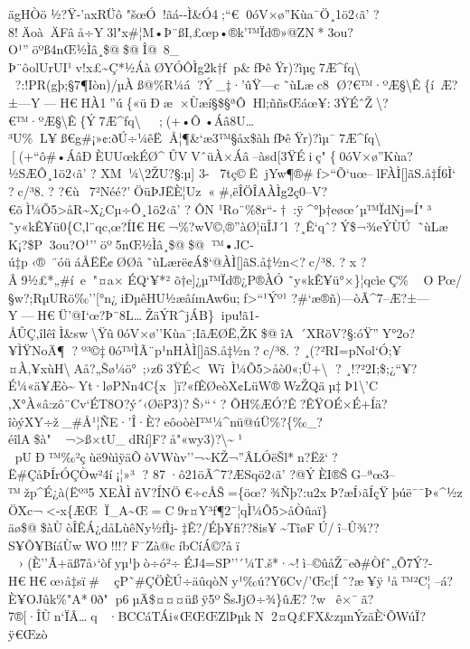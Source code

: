 ägHÒö ½?Ÿ-'axRÜô
"šœÓ!ãá-\/-Ì\textbar\&Ó4;``€0óV×ø''Kùa¯­Ö¸1ö2‹ã'  ? 
8!ÄoàÄFâå÷Y3l"x\#¦M•Þ¨ßI‚£œp•®k'™Ïd®»@ZN*3ou?O¹''öºß4nŒ½Ìâ¸\$@\$@Î@~8\_
Þ¨ôolUrUI¹v!x£\textasciitilde Ç*½ÁàØYÓÔÌg2k†fp\&fÞêŸr)?ìµç7Æ\^{}fq\textbackslash
?:!PR(gþ;§7¶Iòn)/µÀß@\%R¼á?Ý\_‡·'ûŸ---c˜ùLæc8
Ø?€™·ºÆ§\textbackslash Ê\{í~Æ?±---Y---H€HÀ1''ú\{«üÐæ×Ùæí§\$§ªÔHl;ññsŒáœ¥:3ŸÉˆŽ\textbackslash?€™·ºÆ§\textbackslash Ê\{Ý\textquotesingle7Æ\^{}fq\textbackslash

;(+•Ô•Áâ8U\ldots³U\%L¥ß€g\#¡»¢:ðÚ÷¼êËÅ¦¶\&`æ3™­§åx\$àhfÞêŸr)?ìµ¯7Æ\^{}fq\textbackslash

{[}(+``ô\#•ÁâÐÈUUœkÉØ\^{}ÛVVˆüÀ×Áâ--àsd{[}3ŸÉiç"\{0óV×ø''Kùa?½SÆÔ¸1ö2‹ã' 
?  XM~¼\textbackslash2ŽU?§:µ{]}
3-7tç©ËjYw¶®\#f\textgreater``Õ`uœ--lFÀÌ{[}{]}ãS.å‡Í6Ì` ?c/³8. ? 
?€ù~7²Néé?­'ÖüÞJËÈ¦Uz«\#,ëÎÖÎAÀÌg2ç0--V?€õÌ¼Õ5\textgreater åR\textasciitilde X¿Cµ÷Ô¸1ö2‹ã' 
?  ÔN \textquotesingle¹Ro¨\%8r``-†:ÿ\^{}°þ†eøœ´µ™ÏdNj=Í"³
˜y«k\textbar Ê¥ü0\{C,l¨qc,œ?ÍI€H€¬\%?wV©,®''àØ¦üÎJ´l~?¸Ê`qˆ?Ý\$¬¾eÝÙÚ˜ùLæ
K¡?\$P3ou?O¹''öº5nŒ½Ìâ¸\$@\$@™•JC­ú‡p‹®~¨óüáÅËË¢ØØå˜ùLærë¢Á\$`@ÀÌ{[}{]}ãS.å‡½n\textless?c/³8.
?  x ?Â9½£*„\#í~e"¤a× ÉQ`¥*² õ†e {]}¿µ™Ïd®¿P®ÀÓ
˜y«k\textbar Ê¥ü°×\}¦qcìeÇ\% O
Pœ/§w?;RµURö‰''{[}°n¿iÐµêHU½æâímAw6u;f\textgreater``¹Ýº¹
?\#`æ­®ñ)---òÃ\^{}7--Æ?±---Y---H€Ü'@I`œ?Þ¨8L\ldotsŽäÝR\^{}jÁB\}ipu!ã1­ÅÛÇ‚îlêîÌ\textbar\&sw\textbackslash Ÿû0óV×ø''Kùa¯;IãÆØË,ŽK\$@îA~´XRöV?§:óŸ''Y°2o?¥ÌŸNoÄ¶?º³©‡0ó™ÌÃ¨p¹nHÀÌ{[}{]}ãS.å‡½n?c/³8.
? 
¸(?²RI=pNol`Ó;¥¤À‚¥xùH\textbackslashAå?„Šø¼ö°~;›z63ŸÉ\textlessWïÌ¼Õ5\textgreater åò0«;Ü+\textbackslash
?  ¸!?²2I;\$;¿``¥?É¼«ä¥Æò\textasciitildeYt·løPNn4C\{x
\textbar{]}ï?«fÊØeòX¢LüW®WzŽQäµ‡Þ1\textbackslash'C
,X°À«â:zô¨C\textquotesingle v`ÉT8O?ý´‹ØëP3)?Š›``\,`  ? 
ÔH \%ÆÓ?Ê?ÊŸOÉ\textquotesingle×É+Íä?îòýXY÷ž\_\#Å¹¦ÑE·'Î·È?eôoòèI™¼\^{}nü@úÜ\%?\{‰\_?éîlA\$à"¬\textgreater ß×tU\_dRí{]}F?å"«wy3)?\textbackslash\textasciitilde{}¹ 
pUÐ™‰²çùë9ùìÿäÕòVWùv''¬\textasciitilde KŽ¬''ÂLÓëŠl*n?Ëž`?Ë\#ÇåÞÍrÓÇÒw²4í\textquotesingle¡¦»³
?  87·ô21öÃ\^{}7?ÆSqö2‹ã'  ?@ÝÈI®ŠG--ªœ3--™žp\^{}É¿à(Ëº³5
XEÀÌñV?ÍNÖ€÷cÅŠ=\{öœ?¾Ñþ?:u2xÞ?æÍ›ãÍçŸþúë¯¯Þ«\^{}½z
ÖXc¬\textless-x\{ÆŒÏ\_A\textasciitilde Œ=C9r¤Y³f¶2¯¦qÌ¼Õ5\textgreater åÒûaï\}äø\$@\$àÙòÎÊÁ¿dåLùêNy½ƒÌj-‡Ê?/Éþ¥fi??8is¥\textasciitilde TîøFÚ/î--Û¾??S¥Õ¥BíáÙwWO!!!?F¯Zà@cíbCíÁ­©? åï

›(È''Ã+äß7å›`òfyµ¹\textbar þò÷ó²÷ÉJ4=SP''´¼T.š*·\textasciitilde!ì--©ûåŽ¯eð\#Òfˆ„Õ7Ý?-H€H€œ› å‡sï­\#
ç\textquotesingle P˜\#ÇÖÈÚ÷äûqòNy¹‰\textbar ú?Y6Cv/'Œc¦Íˆ?æ¥ÿ¹å™²C¦--á?È¥OJûk\%"A*0ð"p6µÄ\$¤¤¤üßÿ5º\textbar ŠsJjØ÷¾\}ûÆ??wê×¯ã?7®{[}·ÎÙn`ÏÂ\ldots{}q·BCCáTÁi«ŒŒŒZlÞµkN2¤Q£FX\&zµnÝzäÈ`ÕWúÏ?ÿ€Œzò

